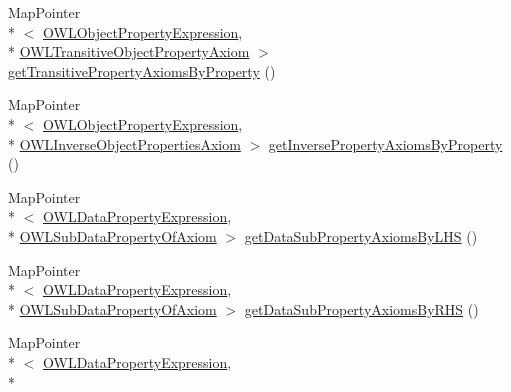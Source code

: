 \begin{DoxyCompactItemize}
\item 
Map\-Pointer\\*
$<$ \hyperlink{interfaceorg_1_1semanticweb_1_1owlapi_1_1model_1_1_o_w_l_object_property_expression}{O\-W\-L\-Object\-Property\-Expression}, \\*
\hyperlink{interfaceorg_1_1semanticweb_1_1owlapi_1_1model_1_1_o_w_l_transitive_object_property_axiom}{O\-W\-L\-Transitive\-Object\-Property\-Axiom} $>$ \hyperlink{classuk_1_1ac_1_1manchester_1_1cs_1_1owl_1_1owlapi_1_1_abstract_internals_impl_adcc6cd3f7860798acd3c366b78539b36}{get\-Transitive\-Property\-Axioms\-By\-Property} ()
\item 
Map\-Pointer\\*
$<$ \hyperlink{interfaceorg_1_1semanticweb_1_1owlapi_1_1model_1_1_o_w_l_object_property_expression}{O\-W\-L\-Object\-Property\-Expression}, \\*
\hyperlink{interfaceorg_1_1semanticweb_1_1owlapi_1_1model_1_1_o_w_l_inverse_object_properties_axiom}{O\-W\-L\-Inverse\-Object\-Properties\-Axiom} $>$ \hyperlink{classuk_1_1ac_1_1manchester_1_1cs_1_1owl_1_1owlapi_1_1_abstract_internals_impl_aab237b310e0fcab7ae5ecf6b06859de8}{get\-Inverse\-Property\-Axioms\-By\-Property} ()
\item 
Map\-Pointer\\*
$<$ \hyperlink{interfaceorg_1_1semanticweb_1_1owlapi_1_1model_1_1_o_w_l_data_property_expression}{O\-W\-L\-Data\-Property\-Expression}, \\*
\hyperlink{interfaceorg_1_1semanticweb_1_1owlapi_1_1model_1_1_o_w_l_sub_data_property_of_axiom}{O\-W\-L\-Sub\-Data\-Property\-Of\-Axiom} $>$ \hyperlink{classuk_1_1ac_1_1manchester_1_1cs_1_1owl_1_1owlapi_1_1_abstract_internals_impl_ad3dffba6232c65b00b985251eac7c052}{get\-Data\-Sub\-Property\-Axioms\-By\-L\-H\-S} ()
\item 
Map\-Pointer\\*
$<$ \hyperlink{interfaceorg_1_1semanticweb_1_1owlapi_1_1model_1_1_o_w_l_data_property_expression}{O\-W\-L\-Data\-Property\-Expression}, \\*
\hyperlink{interfaceorg_1_1semanticweb_1_1owlapi_1_1model_1_1_o_w_l_sub_data_property_of_axiom}{O\-W\-L\-Sub\-Data\-Property\-Of\-Axiom} $>$ \hyperlink{classuk_1_1ac_1_1manchester_1_1cs_1_1owl_1_1owlapi_1_1_abstract_internals_impl_a7ae4b396f3ba9dba3d26997f15149309}{get\-Data\-Sub\-Property\-Axioms\-By\-R\-H\-S} ()
\item 
Map\-Pointer\\*
$<$ \hyperlink{interfaceorg_1_1semanticweb_1_1owlapi_1_1model_1_1_o_w_l_data_property_expression}{O\-W\-L\-Data\-Property\-Expression}, \\*

\end{DoxyCompactItemize}
